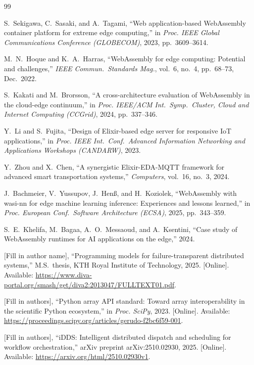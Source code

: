 \begin{thebibliography}{99}

S.~Sekigawa, C.~Sasaki, and A.~Tagami,
``Web application-based WebAssembly container platform for extreme edge computing,''
in \textit{Proc. IEEE Global Communications Conference (GLOBECOM)}, 2023,
pp.~3609--3614.

M.~N.~Hoque and K.~A.~Harras,
``WebAssembly for edge computing: Potential and challenges,''
\textit{IEEE Commun.\ Standards Mag.}, vol.~6, no.~4, pp.~68--73, Dec.\ 2022.

S.~Kakati and M.~Brorsson,
``A cross-architecture evaluation of WebAssembly in the cloud-edge continuum,''
in \textit{Proc. IEEE/ACM Int.\ Symp.\ Cluster, Cloud and Internet Computing
(CCGrid)}, 2024, pp.~337--346.

Y.~Li and S.~Fujita,
``Design of Elixir-based edge server for responsive IoT applications,''
in \textit{Proc. IEEE Int.\ Conf.\ Advanced Information Networking and Applications
Workshops (CANDARW)}, 2023.

Y.~Zhou and X.~Chen,
``A synergistic Elixir-EDA-MQTT framework for advanced smart transportation
systems,''
\textit{Computers}, vol.~16, no.~3, 2024.

J.~Bachmeier, V.~Yussupov, J.~Henß, and H.~Koziolek,
``WebAssembly with wasi-nn for edge machine learning inference: Experiences and
lessons learned,''
in \textit{Proc. European Conf.\ Software Architecture (ECSA)}, 2025,
pp.~343--359.

S.~E.~Khelifa, M.~Bagaa, A.~O.~Messaoud, and A.~Ksentini,
``Case study of WebAssembly runtimes for AI applications on the edge,''
2024.

[Fill in author name],
``Programming models for failure-transparent distributed systems,''
M.S.\ thesis, KTH Royal Institute of Technology, 2025. [Online]. Available:
\url{https://www.diva-portal.org/smash/get/diva2:2013047/FULLTEXT01.pdf}.

[Fill in authors],
``Python array API standard: Toward array interoperability in the scientific
Python ecosystem,''
in \textit{Proc. SciPy}, 2023. [Online]. Available:
\url{https://proceedings.scipy.org/articles/gerudo-f2bc6f59-001}.

[Fill in authors],
``iDDS: Intelligent distributed dispatch and scheduling for workflow
orchestration,''
arXiv preprint arXiv:2510.02930, 2025. [Online]. Available:
\url{https://arxiv.org/html/2510.02930v1}.


\end{thebibliography}
